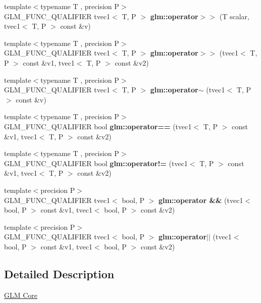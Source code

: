 \begin{DoxyCompactItemize}
\mbox{\label{type__vec1_8inl_abb3e6d01d8d8806a7fe8b4d3c30deeb6}} 
{\footnotesize template$<$typename T , precision P$>$ }\\G\+L\+M\+\_\+\+F\+U\+N\+C\+\_\+\+Q\+U\+A\+L\+I\+F\+I\+ER tvec1$<$ T, P $>$ {\bfseries glm\+::operator$>$$>$} (T scalar, tvec1$<$ T, P $>$ const \&v)
\item 
\mbox{\label{type__vec1_8inl_adbb2f50e95ea7aa74355eb231a305436}} 
{\footnotesize template$<$typename T , precision P$>$ }\\G\+L\+M\+\_\+\+F\+U\+N\+C\+\_\+\+Q\+U\+A\+L\+I\+F\+I\+ER tvec1$<$ T, P $>$ {\bfseries glm\+::operator$>$$>$} (tvec1$<$ T, P $>$ const \&v1, tvec1$<$ T, P $>$ const \&v2)
\item 
\mbox{\label{type__vec1_8inl_abf218640e6cefd3d973d4cdce34795ff}} 
{\footnotesize template$<$typename T , precision P$>$ }\\G\+L\+M\+\_\+\+F\+U\+N\+C\+\_\+\+Q\+U\+A\+L\+I\+F\+I\+ER tvec1$<$ T, P $>$ {\bfseries glm\+::operator$\sim$} (tvec1$<$ T, P $>$ const \&v)
\item 
\mbox{\label{type__vec1_8inl_a1903ed3e722222dd83e25a2f6a82782c}} 
{\footnotesize template$<$typename T , precision P$>$ }\\G\+L\+M\+\_\+\+F\+U\+N\+C\+\_\+\+Q\+U\+A\+L\+I\+F\+I\+ER bool {\bfseries glm\+::operator==} (tvec1$<$ T, P $>$ const \&v1, tvec1$<$ T, P $>$ const \&v2)
\item 
\mbox{\label{type__vec1_8inl_adbcfa5a99a45ab48706d1c04b364aad7}} 
{\footnotesize template$<$typename T , precision P$>$ }\\G\+L\+M\+\_\+\+F\+U\+N\+C\+\_\+\+Q\+U\+A\+L\+I\+F\+I\+ER bool {\bfseries glm\+::operator!=} (tvec1$<$ T, P $>$ const \&v1, tvec1$<$ T, P $>$ const \&v2)
\item 
\mbox{\label{type__vec1_8inl_a700181a24b6c2468ed65d8d4e661f060}} 
{\footnotesize template$<$precision P$>$ }\\G\+L\+M\+\_\+\+F\+U\+N\+C\+\_\+\+Q\+U\+A\+L\+I\+F\+I\+ER tvec1$<$ bool, P $>$ {\bfseries glm\+::operator \&\&} (tvec1$<$ bool, P $>$ const \&v1, tvec1$<$ bool, P $>$ const \&v2)
\item 
\mbox{\label{type__vec1_8inl_aa0e152d191e4ff128af9434eb30aff19}} 
{\footnotesize template$<$precision P$>$ }\\G\+L\+M\+\_\+\+F\+U\+N\+C\+\_\+\+Q\+U\+A\+L\+I\+F\+I\+ER tvec1$<$ bool, P $>$ {\bfseries glm\+::operator$\vert$$\vert$} (tvec1$<$ bool, P $>$ const \&v1, tvec1$<$ bool, P $>$ const \&v2)
\end{DoxyCompactItemize}


\subsection{Detailed Description}
\hyperlink{group__core}{G\+LM Core} 